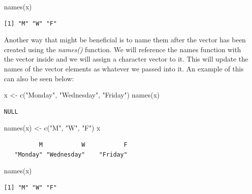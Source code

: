 \documentclass[
  letterpaper,
  DIV=11,
  numbers=noendperiod]{scrreprt}
\newenvironment{Shaded}{\begin{snugshade}}{\end{snugshade}}
\newcommand{\FunctionTok}[1]{\textcolor[rgb]{0.28,0.35,0.67}{#1}}
\newcommand{\NormalTok}[1]{\textcolor[rgb]{0.00,0.23,0.31}{#1}}
\newcommand{\OtherTok}[1]{\textcolor[rgb]{0.00,0.23,0.31}{#1}}
\newcommand{\StringTok}[1]{\textcolor[rgb]{0.13,0.47,0.30}{#1}}
\begin{document}
\begin{Shaded}
\begin{Highlighting}[]
\FunctionTok{names}\NormalTok{(x)}
\end{Highlighting}
\end{Shaded}

\begin{verbatim}
[1] "M" "W" "F"
\end{verbatim}

Another way that might be beneficial is to name them after the vector
has been created using the \emph{names()} function. We will reference
the names function with the vector inside and we will assign a character
vector to it. This will update the names of the vector elements as
whatever we passed into it. An example of this can also be seen below:

\begin{Shaded}
\begin{Highlighting}[]
\NormalTok{x }\OtherTok{\textless{}{-}} \FunctionTok{c}\NormalTok{(}\StringTok{"Monday"}\NormalTok{, }\StringTok{"Wednesday"}\NormalTok{, }\StringTok{"Friday"}\NormalTok{)}
\FunctionTok{names}\NormalTok{(x)}
\end{Highlighting}
\end{Shaded}

\begin{verbatim}
NULL
\end{verbatim}

\begin{Shaded}
\begin{Highlighting}[]
\FunctionTok{names}\NormalTok{(x) }\OtherTok{\textless{}{-}} \FunctionTok{c}\NormalTok{(}\StringTok{"M"}\NormalTok{, }\StringTok{"W"}\NormalTok{, }\StringTok{"F"}\NormalTok{)}
\NormalTok{x}
\end{Highlighting}
\end{Shaded}

\begin{verbatim}
          M           W           F 
   "Monday" "Wednesday"    "Friday" 
\end{verbatim}

\begin{Shaded}
\begin{Highlighting}[]
\FunctionTok{names}\NormalTok{(x)}
\end{Highlighting}
\end{Shaded}

\begin{verbatim}
[1] "M" "W" "F"
\end{verbatim}
\end{document}
